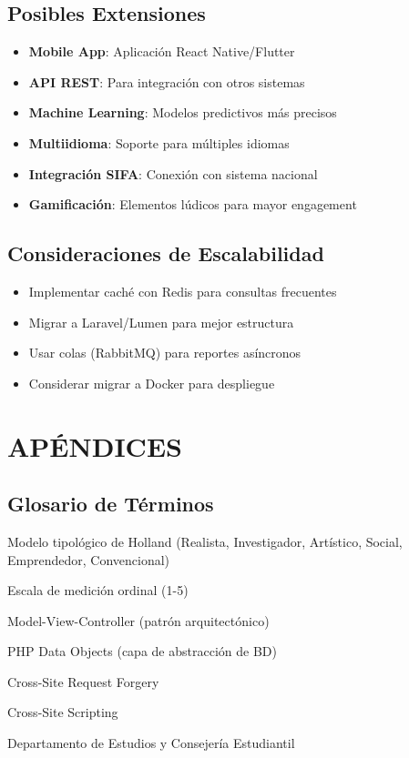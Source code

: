 \documentclass[12pt, a4paper]{report}
\begin{document}
\section{Posibles Extensiones}
\begin{itemize}
    \item \textbf{Mobile App}: Aplicación React Native/Flutter
    \item \textbf{API REST}: Para integración con otros sistemas
    \item \textbf{Machine Learning}: Modelos predictivos más precisos
    \item \textbf{Multiidioma}: Soporte para múltiples idiomas
    \item \textbf{Integración SIFA}: Conexión con sistema nacional
    \item \textbf{Gamificación}: Elementos lúdicos para mayor engagement
\end{itemize}

\section{Consideraciones de Escalabilidad}
\begin{itemize}
    \item Implementar caché con Redis para consultas frecuentes
    \item Migrar a Laravel/Lumen para mejor estructura
    \item Usar colas (RabbitMQ) para reportes asíncronos
    \item Considerar migrar a Docker para despliegue
\end{itemize}

\appendix
\chapter{APÉNDICES}

\section{Glosario de Términos}
\begin{description}[leftmargin=2cm]
    \item[RIASEC] Modelo tipológico de Holland (Realista, Investigador, Artístico, Social, Emprendedor, Convencional)
    \item[Likert] Escala de medición ordinal (1-5)
    \item[MVC] Model-View-Controller (patrón arquitectónico)
    \item[PDO] PHP Data Objects (capa de abstracción de BD)
    \item[CSRF] Cross-Site Request Forgery
    \item[XSS] Cross-Site Scripting
    \item[DECE] Departamento de Estudios y Consejería Estudiantil
\end{description}
\end{document}
